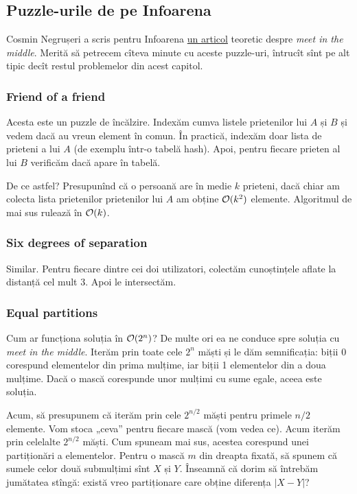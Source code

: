 \documentclass[../main.tex]{subfiles}
\begin{document}
\subsection{Puzzle-urile de pe Infoarena}

Cosmin Negrușeri a scris pentru Infoarena \href{https://www.infoarena.ro/blog/meet-in-the-middle}{un articol} teoretic despre \textit{meet in the middle}. Merită să petrecem cîteva minute cu aceste puzzle-uri, întrucît sînt pe alt tipic decît restul problemelor din acest capitol.

\subsubsection*{Friend of a friend}

Acesta este un puzzle de încălzire. Indexăm cumva listele prietenilor lui $A$ și $B$ și vedem dacă au vreun element în comun. În practică, indexăm doar lista de prieteni a lui $A$ (de exemplu într-o tabelă hash). Apoi, pentru fiecare prieten al lui $B$ verificăm dacă apare în tabelă.

De ce astfel? Presupunînd că o persoană are în medie $k$ prieteni, dacă chiar am colecta lista prietenilor prietenilor lui $A$ am obține $\mathcal{O}(k^2)$ elemente. Algoritmul de mai sus rulează în $\mathcal{O}(k)$.

\subsubsection*{Six degrees of separation}

Similar. Pentru fiecare dintre cei doi utilizatori, colectăm cunoștințele aflate la distanță cel mult 3. Apoi le intersectăm.

\subsubsection*{Equal partitions}

Cum ar funcționa soluția în $\mathcal{O}(2^n)$? De multe ori ea ne conduce spre soluția cu \textit{meet in the middle}. Iterăm prin toate cele $2^n$ măști și le dăm semnificația: biții 0 corespund elementelor din prima mulțime, iar biții 1 elementelor din a doua mulțime. Dacă o mască corespunde unor mulțimi cu sume egale, aceea este soluția.

Acum, să presupunem că iterăm prin cele $2^{n/2}$ măști pentru primele $n/2$ elemente. Vom stoca „ceva” pentru fiecare mască (vom vedea ce). Acum iterăm prin celelalte $2^{n/2}$ măști. Cum spuneam mai sus, acestea corespund unei partiționări a elementelor. Pentru o mască $m$ din dreapta fixată, să spunem că sumele celor două submulțimi sînt $X$ și $Y$. Înseamnă că dorim să întrebăm jumătatea stîngă: există vreo partiționare care obține diferența $|X-Y|$?
\end{document}

